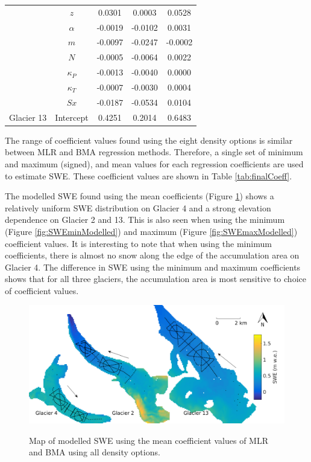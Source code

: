 \documentclass[12pt]{article}
\begin{document}
\begin{table}
\begin{tabular}{ccccc}
 & $z$ & 0.0301 & 0.0003 & 0.0528 \\
 
 & $\alpha$ & -0.0019 & -0.0102 & 0.0031 \\
 
 & $m$ & -0.0097 & -0.0247 & -0.0002 \\
 
 & $N$ & -0.0005 & -0.0064 & 0.0022 \\
 
 & $\kappa_P$ & -0.0013 & -0.0040 & 0.0000 \\
 
 & $\kappa_T$ & -0.0007 & -0.0030 & 0.0004 \\
 
 & $Sx$ & -0.0187 & -0.0534 & 0.0104 \\
 
\multirow{-9}{*}{Glacier 13} & Intercept & 0.4251 & 0.2014 & 0.6483
\end{tabular}
\end{table}	

The range of coefficient values found using the eight density options is similar between MLR and BMA regression methods. Therefore, a single set of minimum and maximum (signed), and mean values for each regression coefficients are used to estimate SWE. These coefficient values are shown in Table \ref{tab:finalCoeff}. 

The modelled SWE found using the mean coefficients (Figure \ref{fig:SWEmeanModelled}) shows a relatively uniform SWE distribution on Glacier 4 and a strong elevation dependence on Glacier 2 and 13. This is also seen when using the minimum (Figure \ref{fig:SWEminModelled}) and maximum (Figure \ref{fig:SWEmaxModelled}) coefficient values. It is interesting to note that when using the minimum coefficients, there is almost no snow along the edge of the accumulation area on Glacier 4. The difference in SWE using the minimum and maximum coefficients shows that for all three glaciers, the accumulation area is most sensitive to choice of coefficient values. 

\begin{figure}[H]
	\centering
	\includegraphics[width =\textwidth]{SWEmeanModelled.png}\\
	\caption{Map of modelled SWE using the mean coefficient values of MLR and BMA using all density options.}
	\label{fig:SWEmeanModelled}
\end{figure}
	
\end{document}
